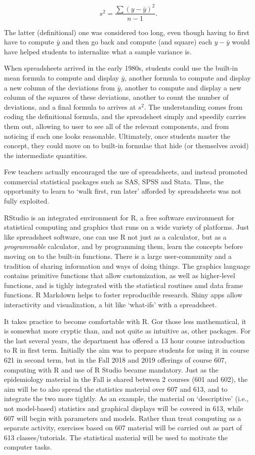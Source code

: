 \documentclass[]{book}
\begin{document}
\[s^2 = \frac{\sum(y - \bar{y})^2}{n-1}.\]

The latter (definitional) one was considered too long, even though having to first have to compute \(\bar{y}\) and then go back and compute (and square) each \(y - \bar{y}\) would have helped students to internalize what a sample variance is.

When spreadsheets arrived in the early 1980s, students could use the built-in mean formula to compute and display \(\bar{y}\), another formula to compute and display a new column of the deviations from \(\bar{y}\), another to compute and display a new column of the squares of these deviations, another to count the number of deviations, and a final formula to arrives at \(s^2.\) The understanding comes from coding the definitional formula, and the spreadsheet simply and speedily carries them out, allowing to user to see all of the relevant components, and from noticing if each one looks reasonable. Ultimately, once students master the concept, they could move on to built-in formulae that hide (or themselves avoid) the intermediate quantities.

Few teachers actually encouraged the use of spreadsheets, and instead promoted commercial statistical packages such as SAS, SPSS and Stata.
Thus, the opportunity to learn to `walk first, run later' afforded by spreadsheets was not fully exploited.

RStudio is an integrated environment for R, a free software environment for statistical computing and graphics that runs on a wide variety of platforms. Just like spreadsheet software, one can use R not just as a calculator, but as a \emph{programmable} calculator, and by programming them, learn the concepts before moving on to the built-in functions. There is a large user-community and a tradition of sharing information and ways of doing things. The graphics language contains primitive functions that allow customization, as well as higher-level functions, and is tighly integrated with the statistical routines amd data frame functions. R Markdown helps to foster reproducible research. Shiny apps allow interactivity and visualization, a bit like `what-ifs' with a spreadsheet.

It takes practice to become comfortable with R. Gor those less mathematical, it is somewhat more cryptic than, and not quite as intuitive as, other packages. For the last several years, the department has offered a 13 hour course introduction to R in first term. Initially the aim was to prepare students for using it in course 621 in second term, but in the Fall 2018 and 2019 offerings of course 607, computing with R and use of R Studio became mandatory. Just as the epidemiology material in the Fall is shared between 2 courses (601 and 602), the aim will be to also spread the statistics material over 607 and 613, and to integrate the two more tightly. As an example, the material on `descriptive' (i.e., not model-based) statistics and graphical displays will be covered in 613, while 607 will begin with parameters and models. Rather than treat computing as a separate activity, exercises based on 607 material will be carried out as part of 613 classes/tutorials. The statistical material will be used to motivate the computer tasks.
\end{document}
